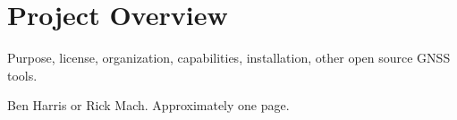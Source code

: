 \section*{Project Overview}

Purpose, license, organization, capabilities, installation, other open source GNSS tools.

Ben Harris or Rick Mach. Approximately one page.
